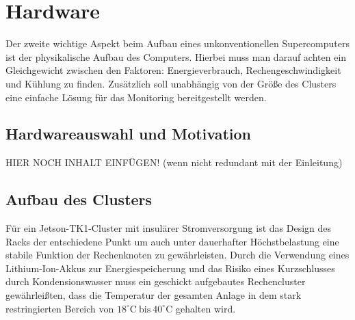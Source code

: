 \section{Hardware}
Der zweite wichtige Aspekt beim Aufbau eines unkonventionellen 
Supercomputers ist der physikalische Aufbau des Computers.
Hierbei muss man darauf achten ein Gleichgewicht zwischen den Faktoren: 
Energieverbrauch, Rechengeschwindigkeit und Kühlung zu finden.
Zusätzlich soll unabhängig von der Größe des Clusters eine
einfache Lösung für das Monitoring bereitgestellt werden.

\subsection{Hardwareauswahl und Motivation}
HIER NOCH INHALT EINFÜGEN! (wenn nicht redundant mit der Einleitung)


\subsection{Aufbau des Clusters}
Für ein Jetson-TK1-Cluster mit insulärer Stromversorgung
ist das Design des Racks der entschiedene Punkt um 
auch unter dauerhafter Höchstbelastung eine
stabile Funktion der Rechenknoten zu gewährleisten.
Durch die Verwendung eines Lithium-Ion-Akkus zur Energiespeicherung
und das Risiko eines Kurzschlusses durch Kondensionswasser muss
ein geschickt aufgebautes Rechencluster gewährleißten, dass die Temperatur
der gesamten Anlage in dem stark restringierten Bereich von 
$18^\circ\text{C}~\text{bis}~40^\circ \text{C}$ gehalten wird. 
